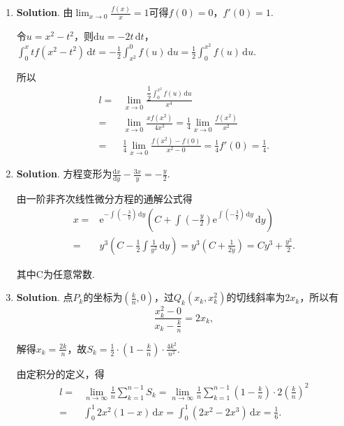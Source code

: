 \documentclass[../Main.tex]{subfiles}
\begin{document}
\begin{enumerate}
          计算$f(-1)=6$，$f\left(-\frac{1}{9}\right)=-\frac{14}{243}$，$f(1)=2$，$f(2
              )=-6$，

          所以$f(x)$在区间$[-1,2]$上的最大值为$6$，最小值为$-6$.

    \item \textbf{Solution}. 由$\lim_{x\to0}\frac{f(x)}{x}=1$可得$f(0)=0$，$f
              '(0)=1$.

          令$u=x^{2}-t^{2}$，则$\mathrm{d}u=-2t\,\mathrm{d}t$，$\int_{0}^{x}tf(x^{2}-t^{2}
              )\,\mathrm{d}t=-\frac{1}{2}\int_{x^2}^{0}f(u)\,\mathrm{d}u=\frac{1}{2}\int_{0}^{x^2}
              f(u)\,\mathrm{d}u$.

          所以
          \[
              \begin{aligned}
                  l = & \lim_{x\to0}\frac{\dfrac{1}{2}\displaystyle\int_{0}^{x^2}f(u)\,\mathrm{d}u}{x^4}  \\
                  =   & \lim_{x\to0}\frac{xf(x^2)}{4x^3}= \frac{1}{4}\lim_{x\to0}\frac{f(x^2)}{x^2}       \\
                  =   & \frac{1}{4}\lim_{x\to0}\frac{f(x^2)-f(0)}{x^2-0}= \frac{1}{4}f'(0) = \frac{1}{4}.
              \end{aligned}
          \]

    \item \textbf{Solution}. 方程变形为$\frac{\mathrm{d}x}{\mathrm{d}y}-\frac{3x}{y}=-\frac{y}{2}$.

          由一阶非齐次线性微分方程的通解公式得
          \[
              \begin{aligned}
                  x = & \mathrm{e}^{-\int\left(-\frac{3}{y}\right)\,\mathrm{d}y}\left(C+\int\left(-\frac{y}{2}\right)\mathrm{e}^{\int\left(-\frac{3}{y}\right)\,\mathrm{d}y}\,\mathrm{d}y\right) \\
                  =   & y^{3}\left(C-\frac{1}{2}\int\frac{1}{y^2}\,\mathrm{d}y\right) = y^{3}\left(C+\frac{1}{2y}\right) = Cy^{3}+\frac{y^2}{2}.
              \end{aligned}
          \]

          其中C为任意常数.

    \item \textbf{Solution}. 点$P_{k}$的坐标为$\left(\frac{k}{n},0\right)$，过$Q
                  _{k}(x_{k},x_{k}^{2})$的切线斜率为$2x_{k}$，所以有
          \[
              \frac{x_{k}^{2}-0}{x_{k}-\frac{k}{n}}=2x_{k},
          \]

          解得$x_{k}=\frac{2k}{n}$，故$S_{k}=\frac{1}{2}\cdot\left(1-\frac{k}{n}\right
              )\cdot\frac{4k^{2}}{n^{2}}$.

          由定积分的定义，得
          \[
              \begin{aligned}
                  l = & \lim_{n\to\infty}\frac{1}{n}\sum_{k=1}^{n-1}S_{k} = \lim_{n\to\infty}\frac{1}{n}\sum_{k=1}^{n-1}\left(1-\frac{k}{n}\right)\cdot 2\left(\frac{k}{n}\right)^{2} \\
                  =   & \int_{0}^{1}2x^{2}(1-x)\,\mathrm{d}x = \int_{0}^{1}(2x^{2}-2x^{3})\,\mathrm{d}x = \frac{1}{6}.
              \end{aligned}
          \]
\end{enumerate}
\end{document}

